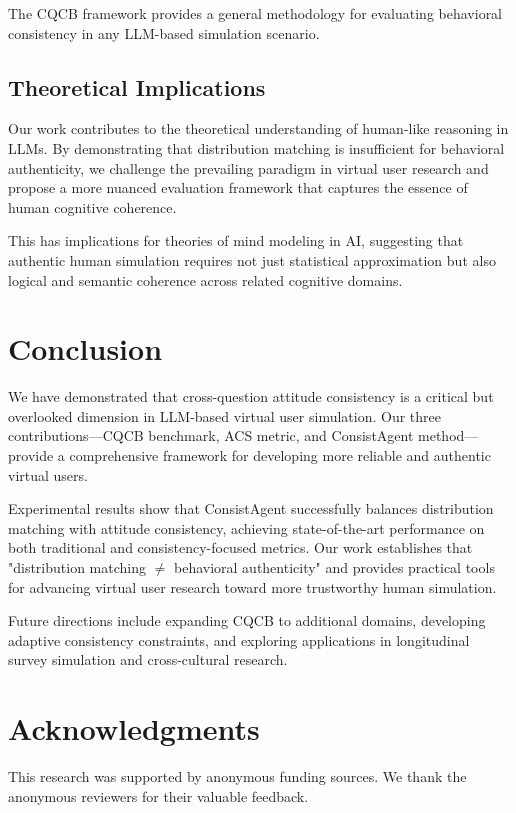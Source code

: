 \documentclass[sigconf, anonymous]{acmart}
\begin{document}
The CQCB framework provides a general methodology for evaluating behavioral consistency in any LLM-based simulation scenario.

\subsection{Theoretical Implications}

Our work contributes to the theoretical understanding of human-like reasoning in LLMs. By demonstrating that distribution matching is insufficient for behavioral authenticity, we challenge the prevailing paradigm in virtual user research and propose a more nuanced evaluation framework that captures the essence of human cognitive coherence.

This has implications for theories of mind modeling in AI, suggesting that authentic human simulation requires not just statistical approximation but also logical and semantic coherence across related cognitive domains.

\section{Conclusion}

We have demonstrated that cross-question attitude consistency is a critical but overlooked dimension in LLM-based virtual user simulation. Our three contributions—CQCB benchmark, ACS metric, and ConsistAgent method—provide a comprehensive framework for developing more reliable and authentic virtual users.

Experimental results show that ConsistAgent successfully balances distribution matching with attitude consistency, achieving state-of-the-art performance on both traditional and consistency-focused metrics. Our work establishes that "distribution matching $\neq$ behavioral authenticity" and provides practical tools for advancing virtual user research toward more trustworthy human simulation.

Future directions include expanding CQCB to additional domains, developing adaptive consistency constraints, and exploring applications in longitudinal survey simulation and cross-cultural research.

\section*{Acknowledgments}

This research was supported by anonymous funding sources. We thank the anonymous reviewers for their valuable feedback.



\end{document}
